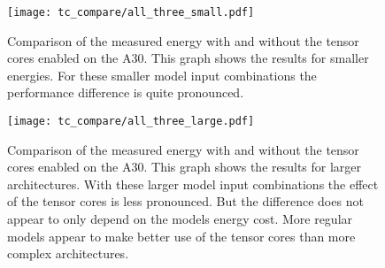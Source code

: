 \documentclass[conference]{IEEEtran}
\begin{document}


\begin{figure}
    \texttt{[image: tc\_compare/all\_three\_small.pdf]}
    \caption{Comparison of the measured energy with and without the tensor cores enabled on the A30. This graph shows the results for smaller energies. For these smaller model input combinations the performance difference is quite pronounced.}
    \label{fig:tcnotcsmall}
    \texttt{[image: tc\_compare/all\_three\_large.pdf]}
    \caption{Comparison of the measured energy with and without the tensor cores enabled on the A30. This graph shows the results for larger architectures. With these larger model input combinations the effect of the tensor cores is less pronounced. But the difference does not appear to only depend on the models energy cost. More regular models appear to make better use of the tensor cores than more complex architectures.}
    \label{fig:tcnotclarge}
\end{figure}
\end{document}
